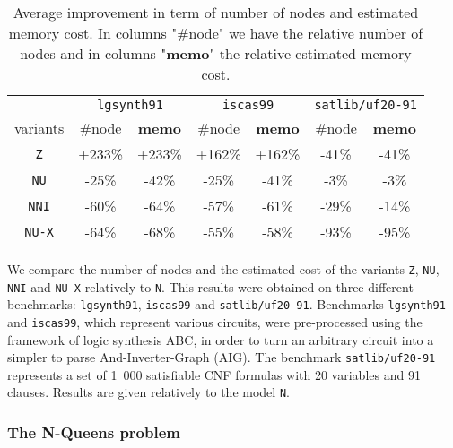 \documentclass[a4paper,10pt]{article}
\begin{document}
\begin{table}
\center
\begin{tabular}{c | c | c | c | c | c | c }
& \multicolumn{2}{c|}{\texttt{lgsynth91}} & \multicolumn{2}{c|}{\texttt{iscas99}} & \multicolumn{2}{c}{\texttt{satlib/uf20-91}} \\
variants      & \#node & \textbf{memo} & \#node & \textbf{memo} & \#node & \textbf{memo} \\
\texttt{Z}    & +233\% & +233\%        & +162\% & +162\%        & -41\%  & -41\%        \\
\texttt{NU}   & -25\%  & -42\%         & -25\%  & -41\%         & -3\%   & -3\%         \\
\texttt{NNI}  & -60\%  & -64\%         & -57\%  & -61\%         & -29\%  & -14\%        \\
\texttt{NU-X} & -64\%  & -68\%         & -55\%  & -58\%         & -93\%  & -95\%        \\
\end{tabular}
\caption{Average improvement in term of number of nodes and estimated memory cost.
In columns "\#node" we have the relative number of nodes and in columns "\textbf{memo}" the relative estimated memory cost.
}
\label{results}
\end{table}

We compare the number of nodes and the estimated cost of the variants \texttt{Z}, \texttt{NU}, \texttt{NNI} and \texttt{NU-X} relatively to \texttt{N}.
This results were obtained on three different benchmarks: \texttt{lgsynth91}\cite{BenchLgsynth91}, \texttt{iscas99}\cite{BenchIscas99} and \texttt{satlib/uf20-91}\cite{BenchSatlib}.
Benchmarks \texttt{lgsynth91} and \texttt{iscas99}, which represent various circuits, were pre-processed using the framework of logic synthesis ABC\cite{Abc}, in order to turn an arbitrary circuit into a simpler to parse And-Inverter-Graph (AIG).
The benchmark \texttt{satlib/uf20-91} represents a set of 1~000 satisfiable CNF formulas with 20 variables and 91 clauses.
Results are given relatively to the model \texttt{N}.


\subsubsection{The N-Queens problem}
\end{document}
